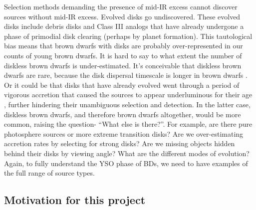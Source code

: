Selection methods demanding the presence of mid-IR excess cannot discover sources without mid-IR excess.  Evolved disks go undiscovered.  These evolved disks include debris disks and Class III analogs that have already undergone a phase of primodial disk clearing (perhaps by planet formation).  This tautological bias means that brown dwarfs with disks are probably over-represented in our counts of young brown dwarfs.  It is hard to say to what extent the number of diskless brown dwarfs is under-estimated.  It's conceivable that diskless brown dwarfs are rare, because the disk dispersal timescale is longer in brown dwarfs \citep{2008ApJ...681.1584R}.  Or it could be that disks that have already evolved went through a period of vigorous accretion that caused the sources to appear underluminous for their age \citep{2009ApJ...702L..27B}, further hindering their unambiguous selection and detection.  In the latter case, diskless brown dwarfs, and therefore brown dwarfs altogether, would be more common, raising the question- ``What else is there?''.  For example, are there pure photosphere sources or more extreme transition disks?  Are we over-estimating accretion rates by selecting for strong disks?  Are we missing objects hidden behind their disks by viewing angle?  What are the different modes of evolution?  Again, to fully understand the YSO phase of BDs, we need to have examples of the full range of source types. 


\subsection{Motivation for this project}

